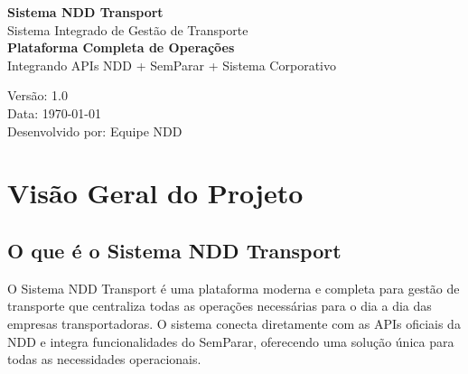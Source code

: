 \documentclass[12pt,a4paper]{article}
\begin{document}
\begin{titlepage}
    \centering
    \vspace*{2cm}

    {\Huge\textcolor{nddblue}{\textbf{Sistema NDD Transport}}}\\[0.5cm]
    {\LARGE\textcolor{nddgray}{Sistema Integrado de Gestão de Transporte}}\\[1.5cm]

    {\Large\textbf{Plataforma Completa de Operações}}\\[0.3cm]
    {\large Integrando APIs NDD + SemParar + Sistema Corporativo}\\[2cm]

    \begin{figure}[H]
        \centering
        \fbox{\begin{minipage}{10cm}
            \centering
            \vspace{3cm}
            {\Large [LOGO NDD TRANSPORT]}
            \vspace{3cm}
        \end{minipage}}
    \end{figure}

    \vfill

    {\large Versão: 1.0}\\[0.3cm]
    {\large Data: \today}\\[0.3cm]
    {\large Desenvolvido por: Equipe NDD}

\end{titlepage}

\tableofcontents
\newpage

\section{Visão Geral do Projeto}

\subsection{O que é o Sistema NDD Transport}
O Sistema NDD Transport é uma plataforma moderna e completa para gestão de transporte que centraliza todas as operações necessárias para o dia a dia das empresas transportadoras. O sistema conecta diretamente com as APIs oficiais da NDD e integra funcionalidades do SemParar, oferecendo uma solução única para todas as necessidades operacionais.
\end{document}
